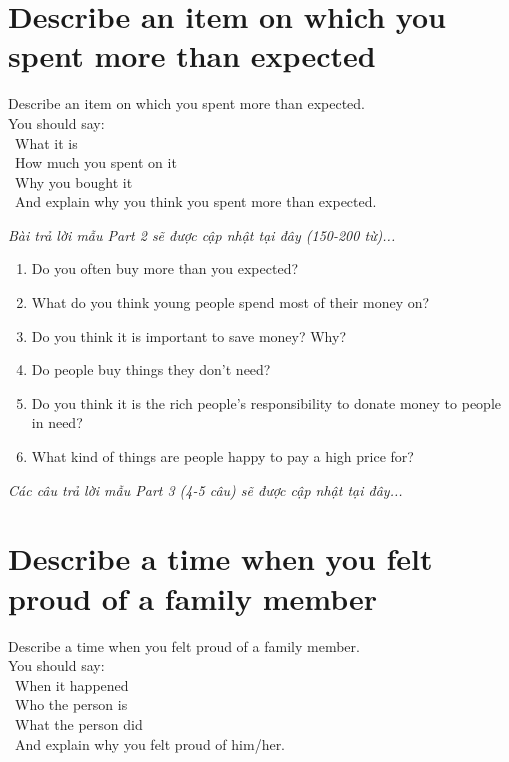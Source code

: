 \section{Describe an item on which you spent more than expected}
\begin{ieltsprompt}
Describe an item on which you spent more than expected. \\
You should say: \\
\textbullet\ What it is \\
\textbullet\ How much you spent on it \\
\textbullet\ Why you bought it \\
\textbullet\ And explain why you think you spent more than expected. \\
\end{ieltsprompt}

\vspace{1em}
\textit{Bài trả lời mẫu Part 2 sẽ được cập nhật tại đây (150-200 từ)...}
\vspace{2em}

\begin{ieltsprompt}
\begin{enumerate}[itemsep=4pt]
    \item Do you often buy more than you expected?
    \item What do you think young people spend most of their money on?
    \item Do you think it is important to save money? Why?
    \item Do people buy things they don't need?
    \item Do you think it is the rich people's responsibility to donate money to people in need?
    \item What kind of things are people happy to pay a high price for?
\end{enumerate}
\end{ieltsprompt}

\vspace{1em}
\textit{Các câu trả lời mẫu Part 3 (4-5 câu) sẽ được cập nhật tại đây...}
\vspace{2em}

\section{Describe a time when you felt proud of a family member}
\begin{ieltsprompt}
Describe a time when you felt proud of a family member. \\
You should say: \\
\textbullet\ When it happened \\
\textbullet\ Who the person is \\
\textbullet\ What the person did \\
\textbullet\ And explain why you felt proud of him/her. \\
\end{ieltsprompt}

